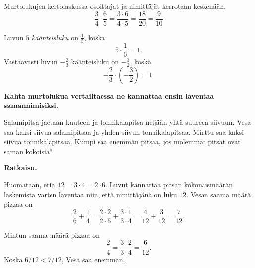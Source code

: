 
\begin{esimerkki}
        Murtolukujen kertolaskussa osoittajat ja nimittäjät kerrotaan keskenään.
      \[
        \frac{3}{4}\cdot \frac{6}{5}= \frac{3\cdot 6}{4\cdot 5}= \frac{18}{20}=\frac{9}{10}
        \]
    \end{esimerkki}
\begin{esimerkki}
	Luvun $5$ \emph{käänteisluku} on $\frac{1}{5}$, koska
	\[
	 5\cdot \frac{1}{5}=1.
	\]
	Vastaavasti luvun $-\frac{2}{3}$ käänteisluku on $-\frac{3}{2}$, koska
	\[
	 -\frac{2}{3}\cdot (-\frac{3}{2})=1.
	\]

\end{esimerkki}
    \textbf{Kahta murtolukua vertailtaessa ne kannattaa ensin laventaa samannimisiksi.}
    
    \begin{esimerkki}
        Salamipitsa jaetaan kuuteen ja tonnikalapitsa neljään yhtä suureen
        siivuun. Vesa saa kaksi siivua salamipitsaa ja yhden siivun tonnikalapitsaa.
        Minttu saa kaksi siivua tonnikalapitsaa. Kumpi saa enemmän pitsaa, jos
        molemmat pitsat ovat saman kokoisia?
        
        
        \textbf{Ratkaisu.}
        
        Huomataan, että $12 = 3\cdot 4 = 2\cdot 6$. Luvut kannattaa
        pitsan kokonaismäärän laskemista varten laventaa niin, että
        nimittäjänä on luku $12$.
        Vesan saama määrä pizzaa on
        \[
            \frac{2}{6} + \frac{1}{4} = 
            \frac{2\cdot 2}{2\cdot 6} + \frac{3\cdot 1}{3\cdot 4} =
            \frac{4}{12}+\frac{3}{12} =
            \frac{7}{12}.
        \]
        
        Mintun saama määrä pizzaa on
        \[
            \frac{2}{4} =
            \frac{3\cdot 2}{3\cdot 4} =
            \frac{6}{12}.
        \]
        Koska $6/12 < 7/12$, Vesa saa enemmän.
    \end{esimerkki}
    
